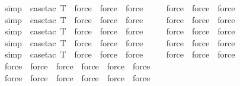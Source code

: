 \begin{isabellebody}
\ \ \isamarkupfalse \ simp\ \isamarkupfalse \ {\isacharparenleft}case{\isacharunderscore}tac\ T{}{\isacharparenright}\ \isamarkupfalse \ force\ \isamarkupfalse \ force\ \isamarkupfalse \ force\isanewline
\ \ \ \ \isamarkupfalse \ force\ \isamarkupfalse \ force\ \isamarkupfalse \ force\isanewline
\ \ \isamarkupfalse \ simp\ \isamarkupfalse \ {\isacharparenleft}case{\isacharunderscore}tac\ T{}{\isacharparenright}\ \isamarkupfalse \ force\ \isamarkupfalse \ force\ \isamarkupfalse \ force\isanewline
\ \ \ \ \isamarkupfalse \ force\ \isamarkupfalse \ force\ \isamarkupfalse \ force\isanewline
\ \ \isamarkupfalse \ simp\ \isamarkupfalse \ {\isacharparenleft}case{\isacharunderscore}tac\ T{}{\isacharparenright}\ \isamarkupfalse \ force\ \isamarkupfalse \ force\ \isamarkupfalse \ force\isanewline
\ \ \ \ \isamarkupfalse \ force\ \isamarkupfalse \ force\ \isamarkupfalse \ force\isanewline
\ \ \isamarkupfalse \ simp\ \isamarkupfalse \ {\isacharparenleft}case{\isacharunderscore}tac\ T{}{\isacharparenright}\ \isamarkupfalse \ force\ \isamarkupfalse \ force\ \isamarkupfalse \ force\isanewline
\ \ \ \ \isamarkupfalse \ force\ \isamarkupfalse \ force\ \isamarkupfalse \ force\isanewline
\ \ \isamarkupfalse \ simp\ \isamarkupfalse \ {\isacharparenleft}case{\isacharunderscore}tac\ T{}{\isacharparenright}\ \isamarkupfalse \ force\ \isamarkupfalse \ force\ \isamarkupfalse \ force\isanewline
\ \ \ \ \isamarkupfalse \ force\ \isamarkupfalse \ force\ \isamarkupfalse \ force\isanewline
\ \ \isamarkupfalse \ force\ \isamarkupfalse \ force\ \isamarkupfalse \ force\ \isamarkupfalse \ force\ \isamarkupfalse \ force\ \isamarkupfalse \ force\isanewline
\ \ \isamarkupfalse \ force\ \isamarkupfalse \ force\ \isamarkupfalse \ force\ \isamarkupfalse \ force\ \isamarkupfalse \ force\ \isamarkupfalse \ force\isanewline

\end{isabellebody}
